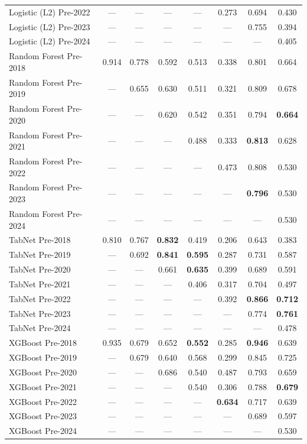 \begin{table}[htbp]
{\begin{tabular}{lccccccc}
Logistic (L2) Pre-2022 & --- & --- & --- & --- & 0.273 & 0.694 & 0.430 \\
Logistic (L2) Pre-2023 & --- & --- & --- & --- & --- & 0.755 & 0.394 \\
Logistic (L2) Pre-2024 & --- & --- & --- & --- & --- & --- & 0.405 \\
Random Forest Pre-2018 & 0.914 & 0.778 & 0.592 & 0.513 & 0.338 & 0.801 & 0.664 \\
Random Forest Pre-2019 & --- & 0.655 & 0.630 & 0.511 & 0.321 & 0.809 & 0.678 \\
Random Forest Pre-2020 & --- & --- & 0.620 & 0.542 & 0.351 & 0.794 & \textbf{0.664} \\
Random Forest Pre-2021 & --- & --- & --- & 0.488 & 0.333 & \textbf{0.813} & 0.628 \\
Random Forest Pre-2022 & --- & --- & --- & --- & 0.473 & 0.808 & 0.530 \\
Random Forest Pre-2023 & --- & --- & --- & --- & --- & \textbf{0.796} & 0.530 \\
Random Forest Pre-2024 & --- & --- & --- & --- & --- & --- & 0.530 \\
TabNet Pre-2018 & 0.810 & 0.767 & \textbf{0.832} & 0.419 & 0.206 & 0.643 & 0.383 \\
TabNet Pre-2019 & --- & 0.692 & \textbf{0.841} & \textbf{0.595} & 0.287 & 0.731 & 0.587 \\
TabNet Pre-2020 & --- & --- & 0.661 & \textbf{0.635} & 0.399 & 0.689 & 0.591 \\
TabNet Pre-2021 & --- & --- & --- & 0.406 & 0.317 & 0.704 & 0.497 \\
TabNet Pre-2022 & --- & --- & --- & --- & 0.392 & \textbf{0.866} & \textbf{0.712} \\
TabNet Pre-2023 & --- & --- & --- & --- & --- & 0.774 & \textbf{0.761} \\
TabNet Pre-2024 & --- & --- & --- & --- & --- & --- & 0.478 \\
XGBoost Pre-2018 & 0.935 & 0.679 & 0.652 & \textbf{0.552} & 0.285 & \textbf{0.946} & 0.639 \\
XGBoost Pre-2019 & --- & 0.679 & 0.640 & 0.568 & 0.299 & 0.845 & 0.725 \\
XGBoost Pre-2020 & --- & --- & 0.686 & 0.540 & 0.487 & 0.793 & 0.659 \\
XGBoost Pre-2021 & --- & --- & --- & 0.540 & 0.306 & 0.788 & \textbf{0.679} \\
XGBoost Pre-2022 & --- & --- & --- & --- & \textbf{0.634} & 0.717 & 0.639 \\
XGBoost Pre-2023 & --- & --- & --- & --- & --- & 0.689 & 0.597 \\
XGBoost Pre-2024 & --- & --- & --- & --- & --- & --- & 0.530 \\
\bottomrule
\end{tabular}%
}
\end{table}
